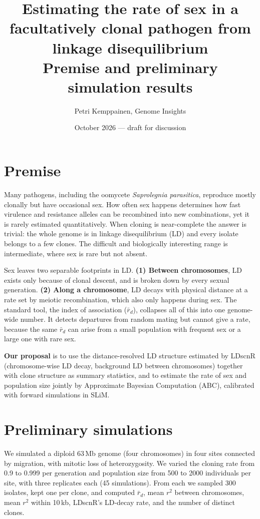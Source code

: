 \documentclass[10pt,a4paper]{article}
\title{\vspace{-1.5cm}Estimating the rate of sex in a facultatively clonal pathogen from linkage disequilibrium\\[0.3em]
\large Premise and preliminary simulation results}
\author{Petri Kemppainen, Genome Insights}
\date{October 2026 --- draft for discussion}
\begin{document}
\maketitle

\section*{Premise}

Many pathogens, including the oomycete \emph{Saprolegnia parasitica}, reproduce mostly clonally but have occasional sex. How often sex happens determines how fast virulence and resistance alleles can be recombined into new combinations, yet it is rarely estimated quantitatively. When cloning is near-complete the answer is trivial: the whole genome is in linkage disequilibrium (LD) and every isolate belongs to a few clones. The difficult and biologically interesting range is intermediate, where sex is rare but not absent.

Sex leaves two separable footprints in LD. \textbf{(1) Between chromosomes}, LD exists only because of clonal descent, and is broken down by every sexual generation. \textbf{(2) Along a chromosome}, LD decays with physical distance at a rate set by meiotic recombination, which also only happens during sex. The standard tool, the index of association ($\bar r_d$), collapses all of this into one genome-wide number. It detects departures from random mating but cannot give a rate, because the same $\bar r_d$ can arise from a small population with frequent sex or a large one with rare sex.

\textbf{Our proposal} is to use the distance-resolved LD structure estimated by LDscnR (chromosome-wise LD decay, background LD between chromosomes) together with clone structure as summary statistics, and to estimate the rate of sex and population size jointly by Approximate Bayesian Computation (ABC), calibrated with forward simulations in SLiM.

\section*{Preliminary simulations}

We simulated a diploid 63\,Mb genome (four chromosomes) in four sites connected by migration, with mitotic loss of heterozygosity. We varied the cloning rate from 0.9 to 0.999 per generation and population size from 500 to 2000 individuals per site, with three replicates each (45 simulations). From each we sampled 300 isolates, kept one per clone, and computed $\bar r_d$, mean $r^2$ between chromosomes, mean $r^2$ within 10\,kb, LDscnR's LD-decay rate, and the number of distinct clones.
\end{document}
